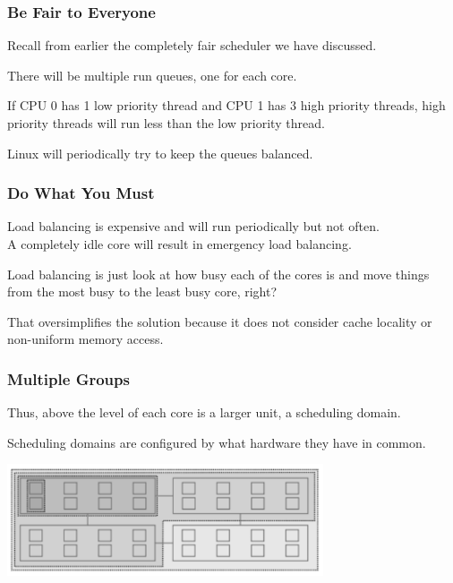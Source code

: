 \begin{frame}
\frametitle{Be Fair to Everyone}

Recall from earlier the completely fair scheduler we have discussed. 

There will be multiple run queues, one for each core. 

If CPU 0 has 1 low priority thread and CPU 1 has 3 high priority threads, high priority threads will run less than the low priority thread. 

Linux will periodically try to keep the queues balanced.

\end{frame}



\begin{frame}
\frametitle{Do What You Must}

Load balancing is expensive and will run periodically but not often.\\
\quad A completely idle core will result in emergency load balancing.

Load balancing is just look at how busy each of the cores is and move things from the most busy to the least busy core, right?

That oversimplifies the solution because it does not consider cache locality or non-uniform memory access.

\end{frame}



\begin{frame}
\frametitle{Multiple Groups}

Thus, above the level of each core is a larger unit, a scheduling domain. 

Scheduling domains are configured by what hardware they have in common.

\begin{center}
	\includegraphics[width=0.7\textwidth]{images/wastedcores.png}\\
\end{center}

\end{frame}



